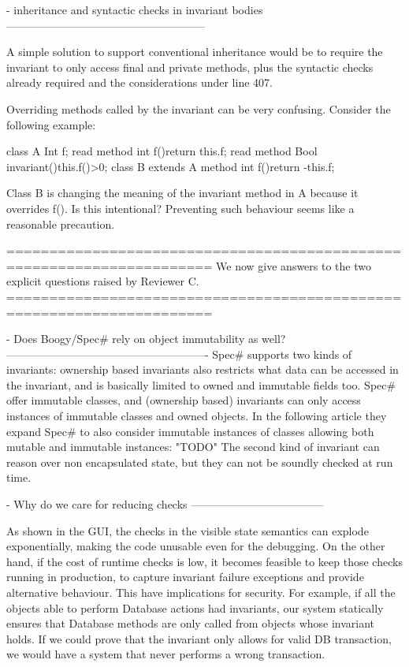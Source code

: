 - inheritance and syntactic checks in invariant bodies
------------------------------------------------------

A simple solution to support conventional inheritance would be to require the invariant to only
access final and private methods,
plus the syntactic checks already required and the considerations under line 407.

Overriding methods called by the invariant can be very confusing.
Consider the following example:

class A{
  Int f;
  read method int f(){return this.f;}
  read method Bool invariant(){this.f()>0;}
}
class B extends A {
  method int f(){return -this.f;}
}

Class B is changing the meaning of the invariant method in A because it overrides f().
Is this intentional? Preventing such behaviour seems like a reasonable precaution.

======================================================================
We now give answers to the two explicit questions raised by Reviewer C.
======================================================================

- Does Boogy/Spec# rely on object immutability as well?
-------------------------------------------------------
Spec# supports two kinds of invariants:  ownership based invariants
 also restricts what data can be accessed in the invariant, and is basically limited
to owned and immutable fields too.
Spec# offer immutable classes, and (ownership based) invariants can only access instances of
immutable classes and owned objects. In the following article they expand Spec# to also
consider immutable instances of classes allowing both mutable and immutable instances: "TODO"
The second kind of invariant can reason over non encapsulated state, but they can not be
soundly checked at run time.

- Why do we care for reducing checks
------------------------------------

As shown in the GUI, the checks in the visible state semantics can explode
exponentially, making the code unusable even for the debugging.
On the other hand, if the cost of runtime checks is low,
it becomes feasible to keep those checks running in production,
to capture invariant failure exceptions and provide alternative behaviour.
This have implications for security.
For example, if all the objects able to perform Database actions had invariants,
our system statically ensures that Database methods are only called from objects whose invariant holds.
If we could prove that the invariant only allows for valid DB transaction, we would have a system
that never performs a wrong transaction.

